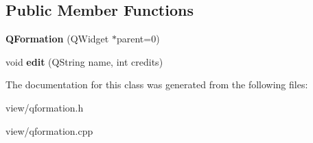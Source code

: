 \subsection*{Public Member Functions}
\begin{DoxyCompactItemize}
\item 
\hypertarget{classQFormation_aada4a1b24fc353a2b320d04c6269b41b}{{\bfseries Q\+Formation} (Q\+Widget $\ast$parent=0)}\label{classQFormation_aada4a1b24fc353a2b320d04c6269b41b}

\item 
\hypertarget{classQFormation_ae7162d1fe4740f300d314fdbca9d1e64}{void {\bfseries edit} (Q\+String name, int credits)}\label{classQFormation_ae7162d1fe4740f300d314fdbca9d1e64}

\end{DoxyCompactItemize}


The documentation for this class was generated from the following files\+:\begin{DoxyCompactItemize}
\item 
view/qformation.\+h\item 
view/qformation.\+cpp\end{DoxyCompactItemize}
